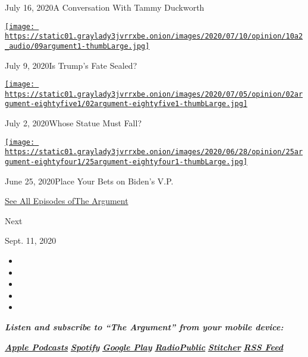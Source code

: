 July 16, 2020A Conversation With Tammy Duckworth

\href{https://www.nytimes3xbfgragh.onion/2020/07/09/opinion/is-trumps-fate-sealed.html?action=click\&module=audio-series-bar\&region=header\&pgtype=Article}{\texttt{[image: https://static01.graylady3jvrrxbe.onion/images/2020/07/10/opinion/10a2\_audio/09argument1-thumbLarge.jpg]}}

July 9, 2020Is Trump's Fate Sealed?

\href{https://www.nytimes3xbfgragh.onion/2020/07/02/opinion/the-argument-protest-statue-revolution.html?action=click\&module=audio-series-bar\&region=header\&pgtype=Article}{\texttt{[image: https://static01.graylady3jvrrxbe.onion/images/2020/07/05/opinion/02argument-eightyfive1/02argument-eightyfive1-thumbLarge.jpg]}}

July 2, 2020Whose Statue Must Fall?

\href{https://www.nytimes3xbfgragh.onion/2020/06/25/opinion/the-argument-biden-vice-president-supreme-court.html?action=click\&module=audio-series-bar\&region=header\&pgtype=Article}{\texttt{[image: https://static01.graylady3jvrrxbe.onion/images/2020/06/28/opinion/25argument-eightyfour1/25argument-eightyfour1-thumbLarge.jpg]}}

June 25, 2020Place Your Bets on Biden's V.P.

\href{https://www.nytimes3xbfgragh.onion/column/the-argument}{See All
Episodes ofThe Argument}

Next

Sept. 11, 2020

\begin{itemize}
\item
\item
\item
\item
\item
\end{itemize}

\emph{\textbf{Listen and subscribe to ``The Argument'' from your mobile
device:}}

\textbf{\href{https://itunes.apple.com/us/podcast/the-argument/id1438024613?mt=2}{\emph{Apple
Podcasts}}} \emph{\textbf{\textbar{}}}
\textbf{\href{https://open.spotify.com/show/6bmhSFLKtApYClEuSH8q42}{\emph{Spotify}}}
\emph{\textbf{\textbar{}}}
\textbf{\href{https://play.google.com/music/m/Idxib4hsg3yviao4gtym76knjjy?t=The_Argument}{\emph{Google
Play}}} \emph{\textbf{\textbar{}}}
\textbf{\href{https://radiopublic.com/the-argument-Wdbepr}{\emph{RadioPublic}}}
\emph{\textbf{\textbar{}}}
\textbf{\href{https://www.stitcher.com/podcast/the-new-york-times/the-argument}{\emph{Stitcher}}}
\emph{\textbf{\textbar{}}}
\textbf{\href{https://rss.art19.com/the-argument}{\emph{RSS Feed}}}

